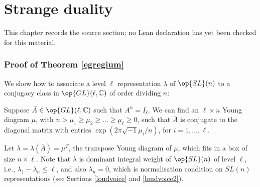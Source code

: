 \chapter{Strange duality}
\label{rigid-local-systems-multiplicative-eigenvalue-problem-chapter-05}

\begin{remark}
\label{rigid-local-systems-multiplicative-eigenvalue-problem-chapter-05-source}
This chapter records the source section; no Lean declaration has yet been checked for this material.
\notready
\end{remark}

\label{SD}
\subsection{Proof of Theorem \ref{egregium}}
 We show how to  associate a level $\ell$ representation $\lambda$ of $\op{SL}(n)$ to  a conjugacy class in $\op{GL}(\ell,\Bbb{C})$ of order dividing $n$:
\begin{defi}
\notready \label{reprem2}
Suppose $\bar{A}\in \op{GL}(\ell,\Bbb{C})$ such that  $A^n=I_{\ell}$.   We can find an $\ell\times n$ Young diagram $\mu$, with $n> \mu_1\geq \mu_2\geq \dots \geq \mu_{\ell}\geq 0$, such that $\bar{A}$ is conjugate to the diagonal matrix with entries $\exp(2\pi\sqrt{-1}\mu_i/n)$, for $i=1,\dots,\ell$.

  Let $\lambda=\lambda(\bar{A})=\mu^T$, the transpose Young diagram of $\mu$, which fits in a box of size $n\times \ell$. Note that $\lambda$ is dominant integral weight of $\op{SL}(n)$ of level $\ell$, i.e., $\lambda_1-\lambda_n \leq \ell$, and also  $\lambda_n=0$, which is  normalisation condition on $SL(n)$ representations (see Sections \ref{loudvoice} and \ref{loudvoice2}).
\end{defi}


